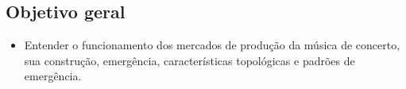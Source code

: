 \documentclass[a4paper, 12pt, openright, oneside, german, french, english, brazil]{abntex2}
\begin{document}
	
	
	
	
	
	
	
	
	
	
	
	
	
	
	
	
	
	\subsection*{Objetivo geral}
	
	
	\begin{itemize}
		\item Entender o funcionamento dos mercados de produção da música de concerto, sua construção, emergência, características topológicas e padrões de emergência.
	\end{itemize}
	
\end{document}
